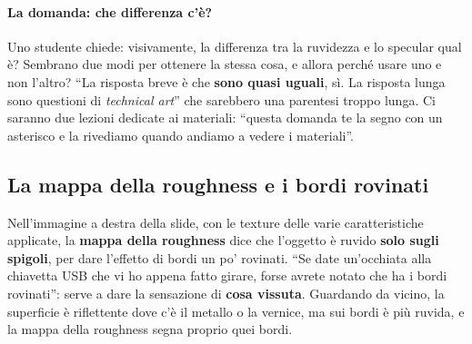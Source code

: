 \paragraph{La domanda: che differenza c'è?} Uno studente chiede: visivamente, la
differenza tra la ruvidezza e lo specular qual è? Sembrano due modi per ottenere
la stessa cosa, e allora perché usare uno e non l'altro? ``La risposta breve è che
\textbf{sono quasi uguali}, sì. La risposta lunga sono questioni di
\emph{technical art}'' che sarebbero una parentesi troppo lunga. Ci saranno due
lezioni dedicate ai materiali: ``questa domanda te la segno con un asterisco e la
rivediamo quando andiamo a vedere i materiali''.

\subsection{La mappa della roughness e i bordi rovinati}

Nell'immagine a destra della slide, con le texture delle varie caratteristiche
applicate, la \textbf{mappa della roughness} dice che l'oggetto è ruvido
\textbf{solo sugli spigoli}, per dare l'effetto di bordi un po' rovinati. ``Se date
un'occhiata alla chiavetta USB che vi ho appena fatto girare, forse avrete notato
che ha i bordi rovinati'': serve a dare la sensazione di \textbf{cosa vissuta}.
Guardando da vicino, la superficie è riflettente dove c'è il metallo o la vernice,
ma sui bordi è più ruvida, e la mappa della roughness segna proprio quei bordi.

